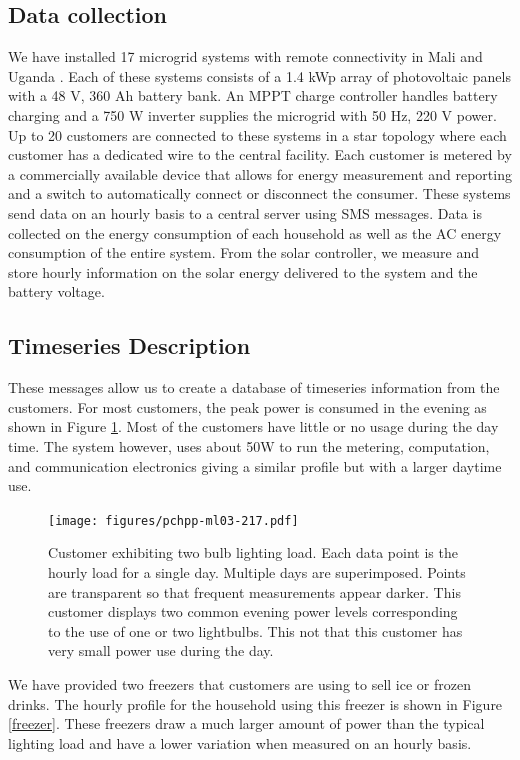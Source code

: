 \documentclass[conference]{IEEEtran}
\begin{document}
\subsection{Data collection}
We have installed 17 microgrid systems with remote connectivity
in Mali and Uganda \cite{ICTD}.
Each of these systems consists of a 1.4 kWp array of photovoltaic
panels with a 48 V, 360 Ah battery bank.
An MPPT charge controller handles battery charging and a
750 W inverter supplies the microgrid with 50 Hz, 220 V power.
Up to 20 customers are connected to these systems in a star
topology where each customer has a dedicated wire to the
central facility.
Each customer is metered by a commercially available device that
allows for energy measurement and reporting and a switch to
automatically connect or disconnect the consumer.
These systems send data on an hourly basis to a central server
using SMS messages.
Data is collected on the energy consumption of each household
as well as the AC energy consumption of the entire system.
From the solar controller, we measure and store hourly information
on the solar energy delivered to the system and the battery
voltage.

\subsection{Timeseries Description}
These messages allow us to create a database of timeseries
information from the customers.
For most customers, the peak power is consumed in the evening
as shown in Figure \ref{two-bulb-profile}.
Most of the customers have little or no usage during the day time.
The system however, uses about 50W to run the metering, computation,
and communication electronics giving a similar profile but with
a larger daytime use.

\begin{figure}[h]
\begin{center}
\texttt{[image: figures/pchpp-ml03-217.pdf]}
\end{center}
\caption{Customer exhibiting two bulb lighting load.
Each data point is the hourly load for a single day.
Multiple days are superimposed.
Points are transparent so that frequent measurements appear darker.
This customer displays two common evening power levels corresponding
to the use of one or two lightbulbs.
This not that this customer has very small power use during the day.}
\label{two-bulb-profile}
\end{figure}

We have provided two freezers that customers are using to
sell ice or frozen drinks.
The hourly profile for the household using this freezer
is shown in Figure \ref{freezer}.
These freezers draw a much larger amount of power than the
typical lighting load and have a lower variation when measured
on an hourly basis.
\end{document}
